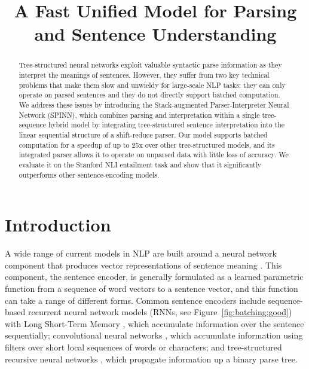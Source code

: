 \documentclass[11pt]{article}
\title{A Fast Unified Model for Parsing and Sentence Understanding}
\author{}
\date{}
\begin{document}
\maketitle
\begin{abstract}

Tree-structured neural networks exploit valuable syntactic parse information as they interpret the meanings of sentences. However, they suffer from two key technical problems that make them slow and unwieldy for large-scale NLP tasks: they can only operate on parsed sentences and they do not directly support batched computation. We address these issues by introducing the Stack-augmented Parser-Interpreter Neural Network (SPINN), which combines parsing and interpretation within a single tree-sequence hybrid model by integrating tree-structured sentence interpretation into the linear sequential structure of a shift-reduce parser. Our model supports batched computation for a speedup of up to 25x over other tree-structured models, and its integrated parser allows it to operate on unparsed data with little loss of accuracy. We evaluate it on the Stanford NLI entailment task and show that it significantly outperforms other sentence-encoding models.
\end{abstract}

\section{Introduction}




A wide range of current models in NLP are built around a neural network component that produces vector representations of sentence meaning \citep[e.g.,][]{sutskever2014sequence,tai2015improved}. This component, the sentence encoder, is generally formulated as a learned parametric function from a sequence of word vectors to a sentence vector, and this function can take a range of different forms. Common sentence encoders include sequence-based recurrent neural network models (RNNs, see Figure~\ref{fig:batching:good}) with Long Short-Term Memory \citep[LSTM,][]{hochreiter1997long}, which accumulate information over the sentence sequentially; convolutional neural networks \citep{kalchbrenner2014convolutional,DBLP:journals/corr/ZhangZL15}, which accumulate information using filters over short local sequences of words or characters; and tree-structured recursive neural networks \citep[TreeRNNs,][see Figure~\ref{fig:batching:bad}]{goller1996learning,socher2011parsing}, which propagate information up a binary parse tree.
\end{document}
